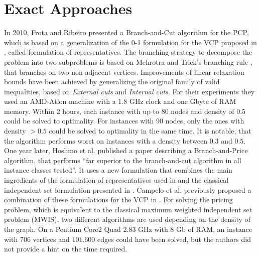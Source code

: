 \section{Exact Approaches}
In 2010, Frota and Ribeiro \cite{frota-07} presented a Branch-and-Cut algorithm for the PCP, which is based on a generalization of the 0-1 formulation for the VCP proposed in \cite{campelo-05,campelo-04}, called formulation of representatives. The branching strategy to decompose the problem into two subproblems is based on Mehrotra and Trick's branching rule \cite{trick-96}, that branches on two non-adjacent vertices. Improvements of linear relaxation bounds have been achieved by generalizing the original family of valid inequalities\cite{campelo-05,campelo-04}, based on \textit{External cuts} and \textit{Internal cuts}. For their experiments they used an AMD-Atlon machine with a 1.8 GHz clock and one Gbyte of RAM memory. Within 2 hours, each instance with up to 80 nodes and density of 0.5 could be solved to optimality. For instances with 90 nodes, only the ones with density $> 0.5$ could be solved to optimality in the same time. It is notable, that the algorithm performs worst on instances with a density between $0.3$ and $0.5$.\\
One year later, Hoshino et al. published a paper describing a Branch-and-Price algorithm, that performs ``far superior to the branch-and-cut algorithm in all instance classes tested''\cite{hoshino-11}. It uses a new formulation that combines the main ingredients of the formulation of representatives used in \cite{frota-07} and the classical independent set formulation presented in \cite{trick-96}. Campelo et al. previously proposed a combination of these formulations for the VCP in \cite{campelo-052}. For solving the pricing problem, which is equivalent to the classical maximum weighted independent set problem (MWIS), two different algorithms are used depending on the density of the graph. On a Pentium Core2 Quad 2.83 GHz with 8 Gb of RAM, an instance with 706 vertices and $101.600$ edges could have been solved, but the authors did not provide a hint on the time required.


